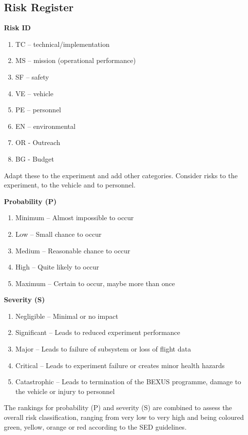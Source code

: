 \pagebreak
\subsection{Risk Register}
\textbf{Risk ID}
\begin{enumerate}[label={}]
    \item TC – technical/implementation 
    \item MS – mission (operational performance) 
    \item SF – safety 
    \item VE – vehicle 
    \item PE – personnel 
    \item EN – environmental 
    \item OR - Outreach
    \item BG - Budget
\end{enumerate}

Adapt these to the experiment and add other categories. 
Consider risks to the experiment, to the vehicle and to personnel. 

\textbf{Probability (P)}
\begin{enumerate}[label=\Alph*]
    \item Minimum – Almost impossible to occur 
    \item Low – Small chance to occur 
    \item Medium – Reasonable chance to occur 
    \item High – Quite likely to occur 
    \item Maximum – Certain to occur, maybe more than once
\end{enumerate}

\textbf{Severity (S)}
\begin{enumerate}
    \item Negligible – Minimal or no impact 
    \item Significant – Leads to reduced experiment performance 
    \item Major – Leads to failure of subsystem or loss of flight data 
    \item Critical – Leads to experiment failure or creates minor health hazards 
    \item Catastrophic – Leads to termination of the BEXUS programme, damage to the vehicle or injury to personnel 
\end{enumerate}

The rankings for probability (P) and severity (S) are combined to assess the overall risk classification, ranging from very low to very high and being coloured green, yellow, orange or red according to the SED guidelines.

\begin{landscape}

\end{landscape}